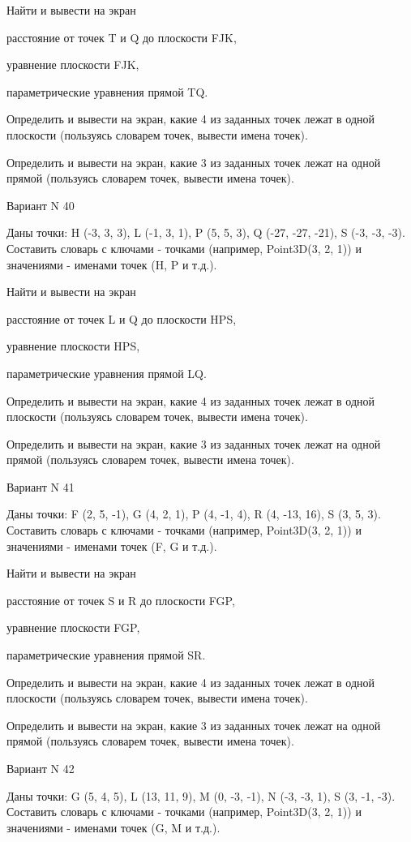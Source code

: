 \documentclass[11pt]{report}
\begin{document}
Найти и вывести на экран


расстояние от точек T и Q до плоскости FJK,


уравнение плоскости FJK,


параметрические уравнения прямой TQ.


Определить и вывести на экран, какие 4 из заданных точек лежат в одной плоскости (пользуясь словарем точек, вывести имена точек).


Определить и вывести на экран, какие 3 из заданных точек лежат на одной прямой (пользуясь словарем точек, вывести имена точек).

\newpage
Вариант N 40

Даны точки: H (-3, 3, 3), L (-1, 3, 1), P (5, 5, 3), Q (-27, -27, -21), S (-3, -3, -3).
Составить словарь с ключами - точками (например, Point3D(3, 2, 1)) и значениями - именами точек (H, P и т.д.).


Найти и вывести на экран


расстояние от точек L и Q до плоскости HPS,


уравнение плоскости HPS,


параметрические уравнения прямой LQ.


Определить и вывести на экран, какие 4 из заданных точек лежат в одной плоскости (пользуясь словарем точек, вывести имена точек).


Определить и вывести на экран, какие 3 из заданных точек лежат на одной прямой (пользуясь словарем точек, вывести имена точек).

\newpage
Вариант N 41

Даны точки: F (2, 5, -1), G (4, 2, 1), P (4, -1, 4), R (4, -13, 16), S (3, 5, 3).
Составить словарь с ключами - точками (например, Point3D(3, 2, 1)) и значениями - именами точек (F, G и т.д.).


Найти и вывести на экран


расстояние от точек S и R до плоскости FGP,


уравнение плоскости FGP,


параметрические уравнения прямой SR.


Определить и вывести на экран, какие 4 из заданных точек лежат в одной плоскости (пользуясь словарем точек, вывести имена точек).


Определить и вывести на экран, какие 3 из заданных точек лежат на одной прямой (пользуясь словарем точек, вывести имена точек).

\newpage
Вариант N 42

Даны точки: G (5, 4, 5), L (13, 11, 9), M (0, -3, -1), N (-3, -3, 1), S (3, -1, -3).
Составить словарь с ключами - точками (например, Point3D(3, 2, 1)) и значениями - именами точек (G, M и т.д.).
\end{document}
